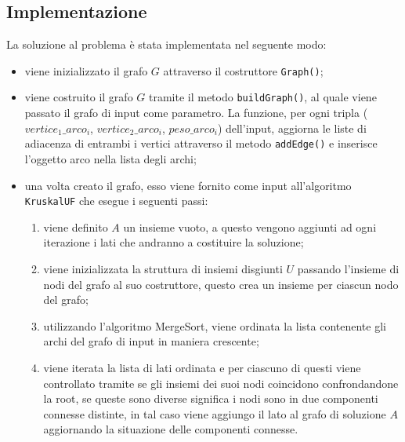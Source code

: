 	\subsection{Implementazione}
		La soluzione al problema è stata implementata nel seguente modo:
		\begin{itemize}
			\item viene inizializzato il grafo $G$ attraverso il costruttore \texttt{Graph()};
			\item viene costruito il grafo $G$ tramite il metodo \texttt{buildGraph()}, al quale viene passato il grafo di input come parametro.
			La funzione, per ogni tripla ($vertice_1\_arco_i$, $vertice_2\_arco_i$, $peso\_arco_i$) dell'input, aggiorna le liste di adiacenza di entrambi i vertici attraverso il metodo \texttt{addEdge()} e inserisce l'oggetto arco nella lista degli archi; 
			\item una volta creato il grafo, esso viene fornito come input all'algoritmo \texttt{KruskalUF} che esegue i seguenti passi:
			\begin{enumerate}  				
				\item viene definito $A$ un insieme vuoto, a questo vengono aggiunti ad ogni iterazione i lati che andranno a costituire la soluzione;
				\item viene inizializzata la struttura di insiemi disgiunti $U$ passando l'insieme di nodi del grafo al suo costruttore, questo crea un insieme per ciascun nodo del grafo;
				\item utilizzando l'algoritmo MergeSort, viene ordinata la lista contenente gli archi del grafo di input in maniera crescente;		
				\item viene iterata la lista di lati ordinata e per ciascuno di questi viene controllato tramite se gli insiemi dei suoi nodi coincidono confrondandone la root, se queste sono diverse significa i nodi sono in due componenti connesse distinte, in tal caso viene aggiungo il lato al grafo di soluzione $A$ aggiornando la situazione delle componenti connesse.
			\end{enumerate}
		\end{itemize}
	
